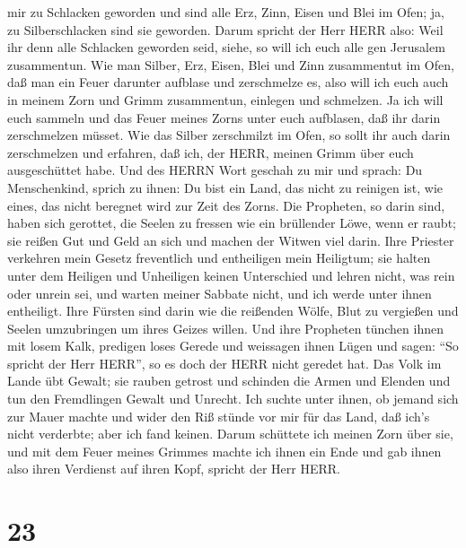 mir zu Schlacken geworden und sind alle Erz, Zinn, Eisen und Blei im
Ofen; ja, zu Silberschlacken sind sie geworden.  Darum
spricht der Herr HERR also: Weil ihr denn alle Schlacken geworden seid,
siehe, so will ich euch alle gen Jerusalem zusammentun. 
Wie man Silber, Erz, Eisen, Blei und Zinn zusammentut im Ofen, daß man
ein Feuer darunter aufblase und zerschmelze es, also will ich euch auch
in meinem Zorn und Grimm zusammentun, einlegen und schmelzen.
 Ja ich will euch sammeln und das Feuer meines Zorns unter
euch aufblasen, daß ihr darin zerschmelzen müsset.  Wie das
Silber zerschmilzt im Ofen, so sollt ihr auch darin zerschmelzen und
erfahren, daß ich, der HERR, meinen Grimm über euch ausgeschüttet habe.
 Und des HERRN Wort geschah zu mir und sprach:
 Du Menschenkind, sprich zu ihnen: Du bist ein Land, das
nicht zu reinigen ist, wie eines, das nicht beregnet wird zur Zeit des
Zorns.  Die Propheten, so darin sind, haben sich gerottet,
die Seelen zu fressen wie ein brüllender Löwe, wenn er raubt; sie reißen
Gut und Geld an sich und machen der Witwen viel darin. 
Ihre Priester verkehren mein Gesetz freventlich und entheiligen mein
Heiligtum; sie halten unter dem Heiligen und Unheiligen keinen
Unterschied und lehren nicht, was rein oder unrein sei, und warten
meiner Sabbate nicht, und ich werde unter ihnen entheiligt.
 Ihre Fürsten sind darin wie die reißenden Wölfe, Blut zu
vergießen und Seelen umzubringen um ihres Geizes willen. 
Und ihre Propheten tünchen ihnen mit losem Kalk, predigen loses Gerede
und weissagen ihnen Lügen und sagen: ``So spricht der Herr HERR'', so es
doch der HERR nicht geredet hat.  Das Volk im Lande übt
Gewalt; sie rauben getrost und schinden die Armen und Elenden und tun
den Fremdlingen Gewalt und Unrecht.  Ich suchte unter
ihnen, ob jemand sich zur Mauer machte und wider den Riß stünde vor mir
für das Land, daß ich's nicht verderbte; aber ich fand keinen.
 Darum schüttete ich meinen Zorn über sie, und mit dem
Feuer meines Grimmes machte ich ihnen ein Ende und gab ihnen also ihren
Verdienst auf ihren Kopf, spricht der Herr HERR.

\hypertarget{section-22}{%
\section{23}\label{section-22}}

